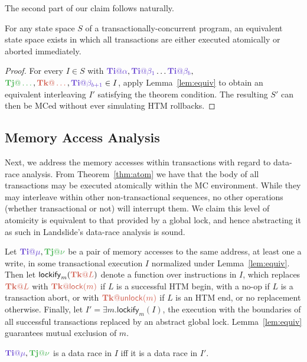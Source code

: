 \documentclass[10pt]{sigplanconf}
\begin{document}
The second part of our claim follows naturally.

\begin{theorem}
	\label{thm:atom}
	For any state space $S$ of a transactionally-concurrent program,
	an equivalent state space exists in which all transactions are either executed atomically or aborted immediately.
\end{theorem}

\begin{proof}
	For every $I \in S$ with $\tiiat{\alpha},\tiiat{\beta_1}\dots\tiiat{\beta_b},$ $\tjjat{\dots},\tkkat{\dots},\tiiat{\beta_{b+1}} \in I$,
	apply Lemma~\ref{lem:equiv} to obtain an equivalent interleaving $I'$ satisfying the theorem condition.
	The resulting $S'$ can then be MCed without ever simulating HTM rollbacks.
\end{proof}

\subsection{Memory Access Analysis}

Next, we address the memory accesses within transactions with regard to data-race analysis.
From Theorem~\ref{thm:atom} we have that the body of all transactions may be executed atomically within the MC environment.
While they may interleave within other non-transactional sequences,
no other operations (whether transactional or not) will interrupt them.
We claim this level of atomicity is equivalent to that provided by a global lock,
and hence abstracting it as such in Landslide's data-race analysis is sound.

Let $\tiiat{\mu},\tjjat{\nu}$ be a pair of memory accesses to the same address, at least one a write,
in some transactional execution $I$ normalized under Lemma~\ref{lem:equiv}.
Then let $\mathsf{lockify}_m(\tkkat{L})$ denote a function over instructions in $I$,
which replaces $\tkkat{L}$ with $\tkkat{\mathsf{lock}(m)}$ if $L$ is a successful HTM begin,
with a no-op if $L$ is a transaction abort,
or with $\tkkat{\mathsf{unlock}(m)}$ if $L$ is an HTM end,
or no replacement otherwise.
Finally, let $I' = \exists m. \mathsf{lockify}_m(I)$,
the execution with the boundaries of all successful transactions replaced by an abstract global lock.
Lemma~\ref{lem:equiv} guarantees mutual exclusion of $m$.

\begin{theorem}
	$\tiiat{\mu},\tjjat{\nu}$ is a data race in $I$ iff it is a data race in $I'$.
\end{theorem}
\end{document}
